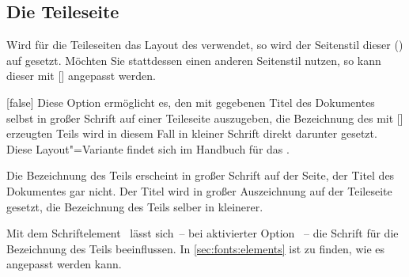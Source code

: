 \begin{Declaration*}{}
\begin{Declaration*}{}
\begin{Declaration*}{}
\subsection{Die Teileseite}
%
%
Wird für die Teileseiten das Layout des \CDs verwendet, so wird der Seitenstil 
dieser () auf  gesetzt. 
Möchten Sie stattdessen einen anderen Seitenstil nutzen, so kann dieser mit 
[]
angepasst werden.

\begin{Declaration}{}[false]%
\printdeclarationlist%
%
%
%
Diese Option ermöglicht es, den mit  gegebenen Titel des 
Dokumentes selbst in großer Schrift auf einer Teileseite auszugeben, die 
Bezeichnung des mit [] erzeugten Teils wird 
in diesem Fall in kleiner Schrift direkt darunter gesetzt. Diese 
Layout"=Variante findet sich im Handbuch für das \TUDCD. \notudscrartcl
%
\begin{values}{}
\itemfalse
  Die Bezeichnung des Teils erscheint in großer Schrift auf der Seite, der 
  Titel des Dokumentes gar nicht.
\itemtrue*
  Der Titel wird in großer Auszeichnung auf der Teileseite gesetzt, die 
  Bezeichnung des Teils selber in kleinerer.
\end{values}
\end{Declaration}

\begin{Declaration}[v2.02]{}
\printdeclarationlist%
%
%
Mit dem Schriftelement~ lässt sich~-- bei aktivierter Option
~-- die Schrift für die Bezeichnung des Teils beeinflussen. 
In \autoref{sec:fonts:elements} ist zu finden, wie es angepasst werden kann.
\end{Declaration}



\end{Declaration*}
\end{Declaration*}
\end{Declaration*}
